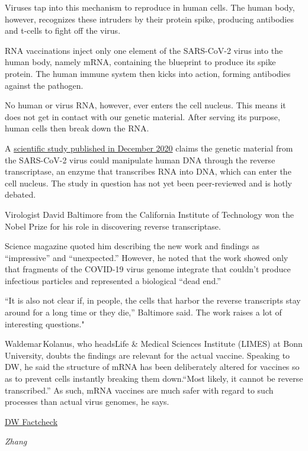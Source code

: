 \documentclass[
]{book}
\begin{document}
Viruses tap into this mechanism to reproduce in human cells. The human body, however, recognizes these intruders by their protein spike, producing antibodies and t-cells to fight off the virus.

RNA vaccinations inject only one element of the SARS-CoV-2 virus into the human body, namely mRNA, containing the blueprint to produce its spike protein. The human immune system then kicks into action, forming antibodies against the pathogen.

No human or virus RNA, however, ever enters the cell nucleus. This means it does not get in contact with our genetic material. After serving its purpose, human cells then break down the RNA.

A \href{https://pubmed.ncbi.nlm.nih.gov/33330870/}{scientific study published in December 2020} claims the genetic material from the SARS-CoV-2 virus could manipulate human DNA through the reverse transcriptase, an enzyme that transcribes RNA into DNA, which can enter the cell nucleus. The study in question has not yet been peer-reviewed and is hotly debated.

Virologist David Baltimore from the California Institute of Technology won the Nobel Prize for his role in discovering reverse transcriptase.

Science magazine quoted him describing the new work and findings as ``impressive'' and ``unexpected.'' However, he noted that the work showed only that fragments of the COVID-19 virus genome integrate that couldn't produce infectious particles and represented a biological ``dead end.''

``It is also not clear if, in people, the cells that harbor the reverse transcripts stay around for a long time or they die,'' Baltimore said. The work raises a lot of interesting questions."

Waldemar\,Kolanus, who headsLife \& Medical Sciences Institute (LIMES) at Bonn University, doubts the findings are relevant for the actual vaccine. Speaking to DW, he said the structure of mRNA has been deliberately altered for vaccines so as to prevent cells instantly breaking them down.``Most likely, it cannot be reverse transcribed.'' As such, mRNA vaccines are much safer with regard to such processes than actual virus genomes, he says.

\href{https://www.dw.com/en/dw-fact-check-four-coronavirus-vaccination-myths-examined/a-57243165}{DW Factcheck}

\emph{Zhang}
\end{document}
